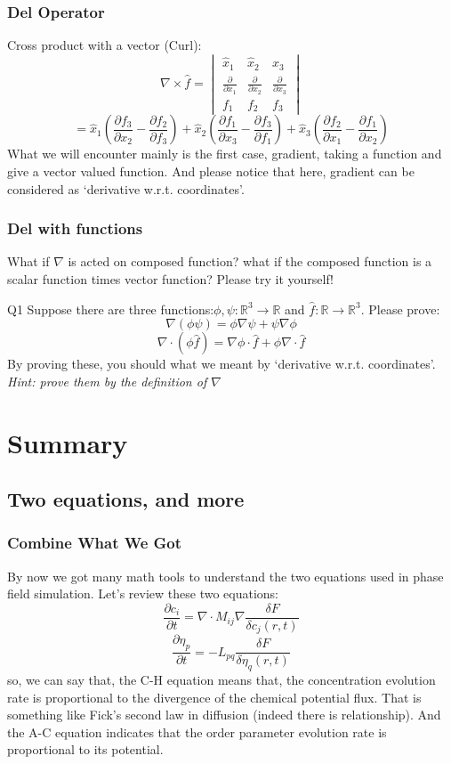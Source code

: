 \documentclass[compress]{beamer}
\begin{document}
\begin{frame}
  \frametitle{Del Operator}
  Cross product with a vector (Curl):
  \[\nabla \times \hat{f} = \begin{vmatrix}
      \hat{x}_1                      & \hat{x}_2                      & \hat{x}_3                      \\
      \frac{\partial }{\partial x_1} & \frac{\partial }{\partial x_2} & \frac{\partial }{\partial x_3} \\
      f_1                            & f_2                            & f_3
    \end{vmatrix}
  \]
  \[ = \hat{x}_1\left( \frac{\partial f_3}{\partial x_2}-\frac{\partial f_2}{\partial f_3} \right)
    + \hat{x}_2\left( \frac{\partial f_1}{\partial x_3}-\frac{\partial f_3}{\partial f_1} \right)
    + \hat{x}_3\left( \frac{\partial f_2}{\partial x_1}-\frac{\partial f_1}{\partial x_2} \right)
  \]
  What we will encounter mainly is the first case, gradient, taking a function and give a vector valued function.
  And please notice that here, gradient can be considered as `derivative w.r.t. coordinates'.
\end{frame}
\begin{frame}
  \frametitle{Del with functions}
  What if \(\nabla\) is acted on composed function? what if the composed function is a scalar function times vector function?
  Please try it yourself!
  \begin{block}{Q1}
    Suppose there are three functions:\(\phi,\psi : \mathbb{R}^3 \to \mathbb{R}\) and \(\hat{f} : \mathbb{R} \to \mathbb{R}^3\).
    Please prove:
    \[\nabla\left( \phi\psi \right) = \phi\nabla\psi + \psi\nabla\phi\]
    \[\nabla\cdot\left( \phi\hat{f} \right) = \nabla\phi\cdot\hat{f} + \phi\nabla\cdot\hat{f}\]
    By proving these, you should what we meant by `derivative w.r.t. coordinates'.
    \bigbreak
    \emph{Hint: prove them by the definition of \(\nabla\)}
  \end{block}
\end{frame}


\section{Summary}
\subsection{Two equations, and more}
\begin{frame}
  \frametitle{Combine What We Got}
  By now we got many math tools to understand the two equations used in phase field simulation. Let's review
  these two equations:
  \[
    \frac{\partial c_i}{\partial t} = \nabla \cdot M_{ij} \nabla \frac{\delta F}{\delta c_j \left( r,t \right)} \tag{C-H}
  \]
  \[
    \frac{\partial \eta_p}{\partial t} = -L_{pq}\frac{\delta F}{\delta\eta_q\left( r,t \right)} \tag{A-C}
  \]
  so, we can say that, the C-H equation means that, the concentration evolution rate is proportional to the divergence
  of the chemical potential flux. That is something like Fick's second law in diffusion (indeed there is relationship).
  And the A-C equation indicates that the order parameter evolution rate is proportional to its potential.
\end{frame}
\end{document}
